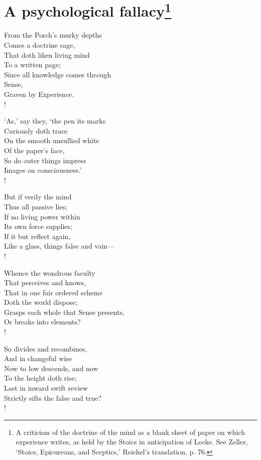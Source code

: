 \documentclass[12pt]{book}
\newenvironment{vpoem}[1]%
  {\def\poemvsindentlines{#1}\begin{poem}\small}%
  {\end{poem}\def\poemvsindentlines{\relax}}
\begin{document}
\section{A psychological fallacy\footnote{A criticism of the doctrine of the mind as a blank sheet of paper on
which experience writes, as held by the Stoics in anticipation of Locke.
See Zeller, `Stoics, Epicureans, and Sceptics,' Reichel's translation,
p. 76.}}

\begin{vpoem}{246}
    From the Porch's murky depths \\
      Comes a doctrine sage, \\
    That doth liken living mind \\
      To a written page; \\
    Since all knowledge comes through \\
      Sense, \\
    Graven by Experience. \\!

    `As,' say they, `the pen its marks \\
      Curiously doth trace \\
    On the smooth unsullied white \\
      Of the paper's face, \\
    So do outer things impress \\
    Images on consciousness.' \\!

    But if verily the mind \\
      Thus all passive lies; \\
    If no living power within \\
      Its own force supplies; \\
    If it but reflect again, \\
    Like a glass, things false and vain--- \\!


    Whence the wondrous faculty \\
      That perceives and knows, \\
    That in one fair ordered scheme \\
      Doth the world dispose; \\
    Grasps each whole that Sense presents, \\
    Or breaks into elements? \\!

    So divides and recombines, \\
      And in changeful wise \\
    Now to low descends, and now \\
      To the height doth rise; \\
    Last in inward swift review \\
    Strictly sifts the false and true? \\!


\end{vpoem}
\end{document}
